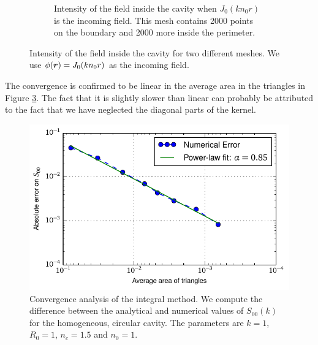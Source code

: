 \begin{figure}
\begin{subfigure}{0.47\textwidth}
		\caption[Intensity of the field inside the cavity, finer mesh]
				{Intensity of the field inside the cavity when
				$J_0(kn_0r)$ is the incoming field. This mesh contains
				2000 points on the boundary and 2000 more inside the perimeter.}
		\label{fig:app.numMethods.field.2000}
	\end{subfigure}
	\caption[Intensity of the field inside the cavity for two different meshes]
			{Intensity of the field inside the cavity for two different meshes.
			We use $\phi(\boldsymbol{r})=J_0(kn_0r)$ as the incoming field.}
	\label{fig:app.numMethods.fields}
\end{figure}

The convergence is confirmed to be linear in the average area in 
the triangles in Figure \ref{fig:app.numMethods.convergenceIntegralMethod}.
The fact that it is slightly slower than linear can probably be 
attributed to the fact that we have neglected the diagonal 
parts of the kernel. 

\begin{figure}
	\centering
	\includegraphics{figs/backmatter/convergenceAnalysis.pdf}
	\caption[Convergence analysis of the integral method]
			{Convergence analysis of the integral method. 
			We compute the difference between the analytical
			and numerical values of $S_{00}(k)$ for the homogeneous,
			circular cavity. The parameters are $k=1$, $R_0=1$, $n_c=1.5$
			and $n_0=1$.}
	\label{fig:app.numMethods.convergenceIntegralMethod}
\end{figure}